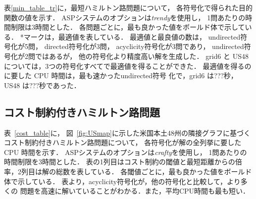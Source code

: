 
表\ref{min_table_tr}に，最短ハミルトン路問題について，
各符号化で得られた目的関数の値を示す．
ASPシステム{\clingo}のオプションは\textit{trendy}を使用し，
1問あたりの時間制限は3時間とした．
% 
各問題ごとに，最も良かった値をボールド体で示している．
*マークは，最適値を表している．
最適値と最良値の数は，
\textsf{undirected}符号化が5問，
\textsf{directed}符号化が3問，
\textsf{acyclicity}符号化が3問であり，
\textsf{undirected}符号化が2問ではあるが，
他の符号化より精度高い解を生成した．
grid6 と US48 については，3つの符号化すべてで最適値を得ることができた．
最適値を得るのに要した CPU 時間は，最も速かった\textsf{undirected}符号
化で，grid6 は???秒，US48 は???秒であった．

\subsection{コスト制約付きハミルトン路問題}


表~\ref{cost_table}に，
図~\ref{fig:USmap}に示した米国本土48州の隣接グラフに基づく
コスト制約付きハミルトン路問題について，
各符号化が解の全列挙に要した CPU 時間を示す．
ASPシステム{\clingo}のオプションは\textit{crafty}を使用し，
1問あたりの時間制限を3時間とした．
表の1列目はコスト制約の閾値と最短距離からの倍率，2列目は解の総数を表している．
各閾値ごとに，最も良かった値をボールド体で示している．
表より，\textsf{acyclicity}符号化が，他の符号化と比較して，より多くの
問題を高速に解いていることがわかる．また，平均CPU時間も最も短い．


